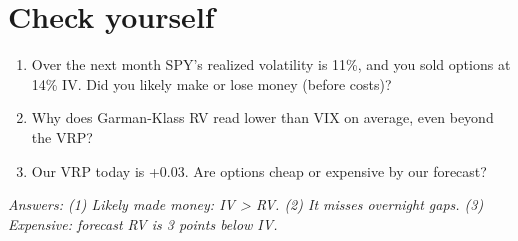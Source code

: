 \documentclass{article}
\begin{document}
\section{Check yourself}

\begin{enumerate}

\item Over the next month SPY's realized volatility is 11\%, and you sold options at 14\% IV. Did you likely make or lose money (before costs)?

\item Why does Garman-Klass RV read lower than VIX on average, even beyond the VRP?

\item Our VRP today is +0.03. Are options cheap or expensive by our forecast?

\end{enumerate}

\emph{Answers: (1) Likely made money: IV > RV. (2) It misses overnight gaps. (3) Expensive: forecast RV is 3 points below IV.}
\end{document}
